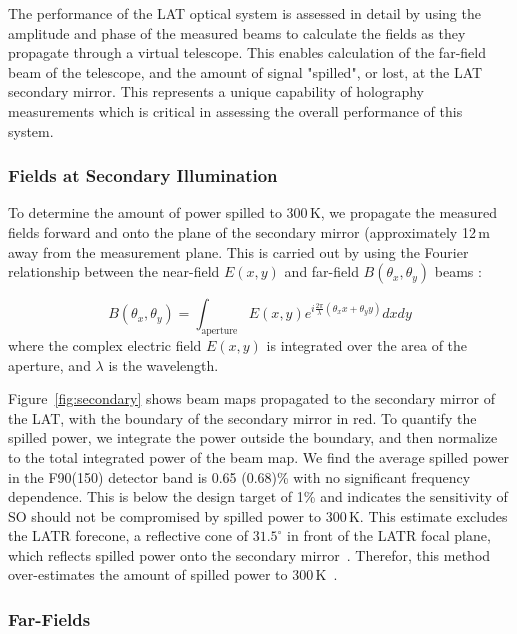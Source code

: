 The performance of the LAT optical system is assessed in detail by using the amplitude and phase of the measured beams to calculate the fields as they propagate through a virtual telescope.  This enables calculation of the far-field beam of the telescope, and the amount of signal "spilled", or lost, at the LAT secondary mirror.  This represents a unique capability of holography measurements which is critical in assessing the overall performance of this system. 

\subsubsection{Fields at Secondary Illumination}
To determine the amount of power spilled to 300\,K, we propagate the measured fields forward and onto the plane of the secondary mirror (approximately 12\,m away from the measurement plane.  This is carried out by using the Fourier relationship between the near-field $E(x,y)$ and far-field $B(\theta_x,\theta_y)$ beams \cite{McIntosh2016,alma_holog}:

\begin{equation}
    B(\theta_x,\theta_y) = \int_{\text{aperture}} E(x,y) e^{ i \frac{2\pi}{\lambda} (\theta_x x + \theta_y y )} dx dy 
\end{equation}
where the complex electric field $E(x,y)$ is integrated over the area of the aperture, and $\lambda$ is the wavelength.

Figure~\ref{fig:secondary} shows beam maps propagated to the secondary mirror of the LAT, with the boundary  of the secondary mirror in red.  To quantify the spilled power, we integrate the power outside the boundary, and then normalize to the total integrated power of the beam map.  We find the average spilled power in the F90(150) detector band is 0.65 (0.68)\% with no significant frequency dependence.  This is below the design target of 1\% and indicates the sensitivity of SO should not be compromised by spilled power to 300\,K.  This estimate excludes the LATR forecone, a reflective cone of $31.5^\circ$ in front of the LATR focal plane, which reflects spilled power onto the secondary mirror~\cite{2021RNAAS...5..100X}.  Therefor, this method over-estimates the amount of spilled power to 300\,K~\cite{Gudmundsson:21}.

\subsubsection{Far-Fields}

